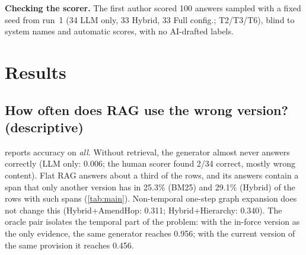 \documentclass[conference]{IEEEtran}
\newcommand{\sys}[1]{\textsf{#1}}
\begin{document}
\textbf{Checking the scorer.} The first author scored 100 answers sampled with a fixed seed from run~1 (34 \sys{LLM only}, 33 \sys{Hybrid}, 33 Full config.; T2/T3/T6), blind to system names and automatic scores, with no AI-drafted labels.

\section{Results}
\label{sec:results}

\subsection{How often does RAG use the wrong version? (descriptive)}

 reports accuracy on \textit{all}. Without retrieval, the generator almost never answers correctly (\sys{LLM only}: 0.006; the human scorer found 2/34 correct, mostly wrong content). Flat RAG answers about a third of the rows, and its answers contain a span that only another version has in 25.3\% (\sys{BM25}) and 29.1\% (\sys{Hybrid}) of the rows with such spans (\cref{tab:main}). Non-temporal one-step graph expansion does not change this (\sys{Hybrid+AmendHop}: 0.311; \sys{Hybrid+Hierarchy}: 0.340). The oracle pair isolates the temporal part of the problem: with the in-force version as the only evidence, the same generator reaches 0.956; with the current version of the same provision it reaches 0.456.
\end{document}
